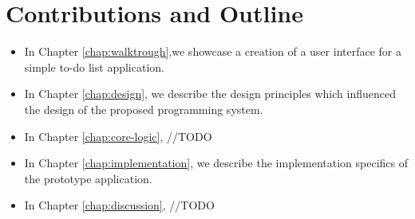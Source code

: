 \section* {Contributions and Outline}
\begin{itemize}
	\item In Chapter \ref{chap:walktrough},we showcase a creation of a user interface for a simple to-do list application.
	\item In Chapter \ref{chap:design}, we describe the design principles which influenced the design of the proposed programming system.
	\item In Chapter \ref{chap:core-logic}, //TODO
	\item In Chapter \ref{chap:implementation}, we describe the implementation specifics of the prototype application.
	\item In Chapter \ref{chap:discussion}, //TODO
\end{itemize}
